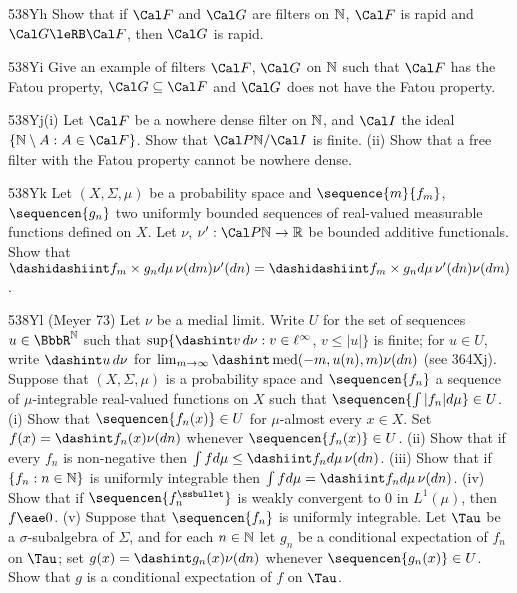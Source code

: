 {\spheader 538Yh Show that if $\Cal F$ and $\Cal G$ are filters
on $\Bbb N$, $\Cal F$ is rapid and $\Cal G\leRB\Cal F$, then $\Cal G$ is
rapid.

\spheader 538Yi Give an example of filters $\Cal F$, $\Cal G$ on $\Bbb N$
such that $\Cal F$ has the Fatou property, $\Cal G\subseteq\Cal F$ and
$\Cal G$ does not have the Fatou property.

\spheader 538Yj(i) Let $\Cal F$ be a nowhere dense filter on $\Bbb N$,
and $\Cal I$ the
ideal $\{\Bbb N\setminus A:A\in\Cal F\}$.   Show that
$\Cal P\Bbb N/\Cal I$ is finite.
(ii) Show that a free filter with the Fatou property cannot be nowhere
dense.

\spheader 538Yk Let $(X,\Sigma,\mu)$ be a probability space
and $\sequence{m}{f_m}$, $\sequencen{g_n}$ two uniformly bounded
sequences of real-valued measurable functions defined on $X$.
Let $\nu$,
$\nu':\Cal P\Bbb N\to\Bbb R$ be bounded additive functionals.   Show that
$\dashidashiint f_m\times g_nd\mu\,\nu(dm)\nu'(dn)
=\dashidashiint f_m\times g_nd\mu\,\nu'(dn)\nu(dm)$.

\spheader 538Yl ({\smc Meyer 73})
Let $\nu$ be a medial limit.   Write $U$ for the set of
sequences $u\in\BbbR^{\Bbb N}$ such that
$\sup\{\dashint v\,d\nu:v\in\ell^{\infty}$, $v\le|u|\}$ is
finite;  for $u\in U$, write $\dashint u\,d\nu$ for
$\lim_{m\to\infty}\dashint\med(-m,u(n),m)\nu(dn)$
(see 364Xj).
Suppose that $(X,\Sigma,\mu)$ is a probability space and
$\sequencen{f_n}$ a sequence of $\mu$-integrable real-valued functions
on $X$ such that $\sequencen{\int|f_n|d\mu}\in U$.
(i) Show that $\sequencen{f_n(x)}\in U$ for $\mu$-almost every
$x\in X$.   Set $f(x)=\dashint f_n(x)\nu(dn)$ whenever
$\sequencen{f_n(x)}\in U$.
(ii) Show that if every $f_n$ is non-negative then
$\int fd\mu\le\dashiint f_nd\mu\,\nu(dn)$.
(iii) Show that if $\{f_n:n\in\Bbb N\}$ is uniformly integrable then
$\int fd\mu=\dashiint f_nd\mu\,\nu(dn)$.
(iv)
Show that if $\sequencen{f_n^{\ssbullet}}$ is weakly convergent to $0$
in $L^1(\mu)$, then $f\eae 0$.   (v)
Suppose that $\sequencen{f_n}$ is uniformly integrable.
Let $\Tau$ be a $\sigma$-subalgebra of $\Sigma$, and for
each $n\in\Bbb N$ let $g_n$ be a conditional expectation of $f_n$ on
$\Tau$;  set
$g(x)=\dashint g_n(x)\nu(dn)$ whenever $\sequencen{g_n(x)}\in U$.
Show that
$g$ is a conditional expectation of $f$ on $\Tau$.

}
